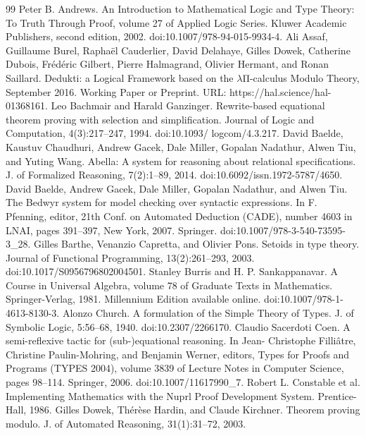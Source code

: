 \begin{thebibliography}{99}
 Peter B. Andrews. An Introduction to Mathematical Logic and Type Theory: To Truth Through Proof, volume 27 of Applied Logic Series. Kluwer Academic Publishers, second edition, 2002. doi:10.1007/978-94-015-9934-4.
 Ali Assaf, Guillaume Burel, Raphaël Cauderlier, David Delahaye, Gilles Dowek, Catherine Dubois, Frédéric Gilbert, Pierre Halmagrand, Olivier Hermant, and Ronan Saillard. Dedukti: a Logical Framework based on the \ensuremath{\lambda}Π-calculus Modulo Theory, September 2016. Working Paper or Preprint. URL: https://hal.science/hal-01368161.
 Leo Bachmair and Harald Ganzinger. Rewrite-based equational theorem proving with selection and simplification. Journal of Logic and Computation, 4(3):217–247, 1994. doi:10.1093/ logcom/4.3.217.
 David Baelde, Kaustuv Chaudhuri, Andrew Gacek, Dale Miller, Gopalan Nadathur, Alwen Tiu, and Yuting Wang. Abella: A system for reasoning about relational specifications. J. of Formalized Reasoning, 7(2):1–89, 2014. doi:10.6092/issn.1972-5787/4650.
 David Baelde, Andrew Gacek, Dale Miller, Gopalan Nadathur, and Alwen Tiu. The Bedwyr system for model checking over syntactic expressions. In F. Pfenning, editor, 21th Conf. on Automated Deduction (CADE), number 4603 in LNAI, pages 391–397, New York, 2007. Springer. doi:10.1007/978-3-540-73595-3\_28.
 Gilles Barthe, Venanzio Capretta, and Olivier Pons. Setoids in type theory. Journal of Functional Programming, 13(2):261–293, 2003. doi:10.1017/S0956796802004501.
 Stanley Burris and H. P. Sankappanavar. A Course in Universal Algebra, volume 78 of Graduate Texts in Mathematics. Springer-Verlag, 1981. Millennium Edition available online. doi:10.1007/978-1-4613-8130-3.
 Alonzo Church. A formulation of the Simple Theory of Types. J. of Symbolic Logic, 5:56–68, 1940. doi:10.2307/2266170.
 Claudio Sacerdoti Coen. A semi-reflexive tactic for (sub-)equational reasoning. In Jean- Christophe Filliâtre, Christine Paulin-Mohring, and Benjamin Werner, editors, Types for Proofs and Programs (TYPES 2004), volume 3839 of Lecture Notes in Computer Science, pages 98–114. Springer, 2006. doi:10.1007/11617990\_7.
 Robert L. Constable et al. Implementing Mathematics with the Nuprl Proof Development System. Prentice-Hall, 1986.
 Gilles Dowek, Thérèse Hardin, and Claude Kirchner. Theorem proving modulo. J. of Automated Reasoning, 31(1):31–72, 2003.

\end{thebibliography}
